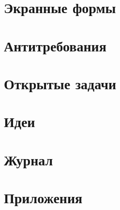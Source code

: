 \section{Экранные формы}
\section{Антитребования}
\section{Открытые задачи}
\section{Идеи}
\section{Журнал}
\section{Приложения}
